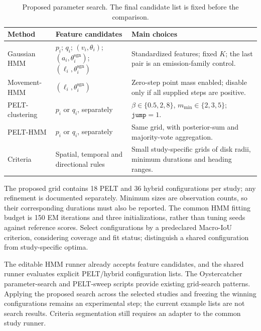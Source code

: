 \begin{table}[htbp]
\centering
\small
\caption{Proposed parameter search. The final candidate list is fixed before the comparison.}
\label{tab:seg-parameter-search}
\begin{tabularx}{\textwidth}{@{}l >{\raggedright\arraybackslash}X >{\raggedright\arraybackslash}X@{}}
\toprule
Method & Feature candidates & Main choices \\
\midrule
Gaussian HMM & $p_i$; $q_i$; $(v_i,\theta_i)$; $(a_i,\theta_i^{\mathrm{sgn}})$; $(\ell_i,\theta_i^{\mathrm{sgn}})$ & Standardized features; fixed $K$; the last pair is an emission-family control. \\
Movement-HMM & $(\ell_i,\theta_i^{\mathrm{sgn}})$ & Zero-step point mass enabled; disable only if all supplied steps are positive. \\
PELT-clustering & $p_i$ or $q_i$, separately & $\beta\in\{0.5,2,8\}$, $m_{\min}\in\{2,3,5\}$; $\texttt{jump}=1$. \\
PELT-HMM & $p_i$ or $q_i$, separately & Same grid, with posterior-sum and majority-vote aggregation. \\
Criteria & Spatial, temporal and directional rules & Small study-specific grids of disk radii, minimum durations and heading ranges. \\
\bottomrule
\end{tabularx}
\end{table}

The proposed grid contains 18 PELT and 36 hybrid configurations per study; any refinement is documented separately.
Minimum sizes are observation counts, so their corresponding durations must also be reported.
The common HMM fitting budget is 150 EM iterations and three initializations, rather than tuning seeds against reference scores.
Select configurations by a predeclared Macro-IoU criterion, considering coverage and fit status; distinguish a shared configuration from study-specific optima.

The editable HMM runner already accepts feature candidates, and the shared runner evaluates explicit PELT/hybrid configuration lists.
The Oystercatcher parameter-search and PELT-sweep scripts provide existing grid-search patterns.
Applying the proposed search across the selected studies and freezing the winning configurations remains an experimental step; the current example lists are not search results.
Criteria segmentation still requires an adapter to the common study runner.

